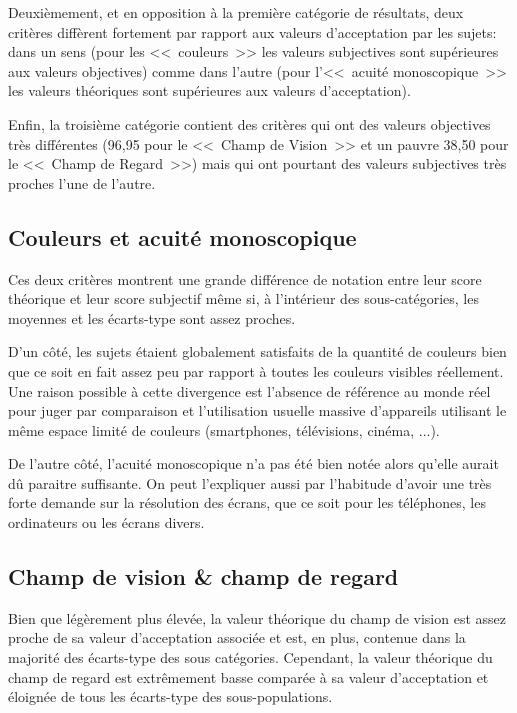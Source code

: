 	\par Deuxièmement, et en opposition à la première catégorie de résultats, deux critères diffèrent fortement par rapport aux valeurs d'acceptation par les sujets: dans un sens (pour les <<~couleurs~>> les valeurs subjectives sont supérieures aux valeurs objectives) comme dans l'autre (pour l'<<~acuité monoscopique~>> les valeurs théoriques sont supérieures aux valeurs d'acceptation).
	
	\par Enfin, la troisième catégorie contient des critères qui ont des valeurs objectives très différentes (96,95 pour le  <<~Champ de Vision~>> et un pauvre 38,50 pour le <<~Champ de Regard~>>) mais qui ont pourtant des valeurs subjectives très proches l'une de l'autre.   
	
	\subsection{Couleurs et acuité monoscopique}
	\par Ces deux critères montrent une grande différence de notation entre leur score théorique et leur score subjectif même si, à l'intérieur des sous-catégories, les moyennes et les écarts-type sont assez proches.
	
	\par D'un côté, les sujets étaient globalement satisfaits de la quantité de couleurs bien que ce soit en fait assez peu par rapport à toutes les couleurs visibles réellement. Une raison possible à cette divergence est l'absence de référence au monde réel pour juger par comparaison et l'utilisation usuelle massive d'appareils utilisant le même espace limité de couleurs (smartphones, télévisions, cinéma, ...).
	
	\par De l'autre côté, l'acuité monoscopique n'a pas été bien notée alors qu'elle aurait dû paraitre suffisante. On peut l'expliquer aussi par l'habitude d'avoir une très forte demande sur la résolution des écrans, que ce soit pour les téléphones, les ordinateurs ou les écrans divers.
	
	\subsection{Champ de vision \& champ de regard}
	\par Bien que légèrement plus élevée, la valeur théorique du champ de vision est assez proche de sa valeur d'acceptation associée et est, en plus, contenue dans la majorité des écarts-type des sous catégories. Cependant, la valeur théorique du champ de regard est extrêmement basse comparée à sa valeur d'acceptation et éloignée de tous les écarts-type des sous-populations.
	
